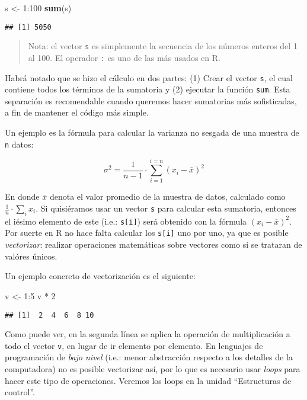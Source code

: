 \documentclass[]{article}
\newenvironment{Shaded}{}{}
\newcommand{\KeywordTok}[1]{\textcolor[rgb]{0.00,0.44,0.13}{\textbf{{#1}}}}
\newcommand{\DecValTok}[1]{\textcolor[rgb]{0.25,0.63,0.44}{{#1}}}
\newcommand{\NormalTok}[1]{{#1}}
\begin{document}
\begin{Shaded}
\begin{Highlighting}[]
\NormalTok{s <- }\DecValTok{1}\NormalTok{:}\DecValTok{100}
\KeywordTok{sum}\NormalTok{(s)}
\end{Highlighting}
\end{Shaded}
\begin{verbatim}
## [1] 5050
\end{verbatim}
\begin{quote}
Nota: el vector \texttt{s} es simplemente la secuencia de los números
enteros del 1 al 100. El operador \texttt{:} es uno de las más usados en
R.

\end{quote}
Habrá notado que se hizo el cálculo en dos partes: (1) Crear el vector
\texttt{s}, el cual contiene todos los términos de la sumatoria y (2)
ejecutar la función \texttt{sum}. Esta separación es recomendable cuando
queremos hacer sumatorias más sofisticadas, a fin de mantener el código
más simple.

Un ejemplo es la fórmula para calcular la varianza no sesgada de una
muestra de \texttt{n} datos:

\[
  \sigma ^ 2 = \frac{1}{n - 1} \cdot \sum_{i=1}^{i=n} (x_i - \overline{x}) ^ 2 
\]

En donde $\overline{x}$ denota el valor promedio de la muestra de datos,
calculado como $\frac{1}{n} \cdot \sum_i x_i$. Si quisiéramos usar un
vector \texttt{s} para calcular esta sumatoria, entonces el iésimo
elemento de este (i.e.: \texttt{s{[}i{]}}) será obtenido con la fórmula
$(x_i - \overline{x}) ^ 2$. Por suerte en R no hace falta calcular los
\texttt{s{[}i{]}} uno por uno, ya que es posible \emph{vectorizar}:
realizar operaciones matemáticas sobre vectores como si se trataran de
valóres únicos.

Un ejemplo concreto de vectorización es el siguiente:

\begin{Shaded}
\begin{Highlighting}[]
\NormalTok{v <- }\DecValTok{1}\NormalTok{:}\DecValTok{5}
\NormalTok{v * }\DecValTok{2}
\end{Highlighting}
\end{Shaded}
\begin{verbatim}
## [1]  2  4  6  8 10
\end{verbatim}
Como puede ver, en la segunda línea se aplica la operación de
multiplicación a todo el vector \texttt{v}, en lugar de ir elemento por
elemento. En lenguajes de programación de \emph{bajo nivel} (i.e.: menor
abstracción respecto a los detalles de la computadora) no es posible
vectorizar así, por lo que es necesario usar \emph{loops} para hacer
este tipo de operaciones. Veremos los loops en la unidad ``Estructuras
de control''.
\end{document}
